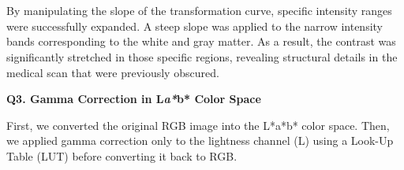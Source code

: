 \documentclass[11pt]{article}
\begin{document}
    \begin{center}
    \end{center}
    { \hspace*{\fill} \\}
    
    \begin{center}
    \end{center}
    { \hspace*{\fill} \\}
    
    By manipulating the slope of the transformation curve, specific
intensity ranges were successfully expanded. A steep slope was applied
to the narrow intensity bands corresponding to the white and gray
matter. As a result, the contrast was significantly stretched in those
specific regions, revealing structural details in the medical scan that
were previously obscured.

   \textbf{\Large Q3. Gamma Correction in L\emph{a*}b* Color Space}

    First, we converted the original RGB image into the L*a*b* color space.
Then, we applied gamma correction only to the lightness channel (L)
using a Look-Up Table (LUT) before converting it back to RGB.
\end{document}
